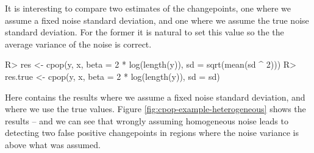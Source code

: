 \documentclass[article]{jss}
\begin{document}
It is interesting to compare two estimates of the changepoints, one where we assume a fixed noise standard deviation, and one where we assume the true noise standard deviation. For the former it is natural to set this value so the the average variance of the noise is correct. 
\begin{CodeChunk}
\begin{CodeInput}
R> res <- cpop(y, x, beta = 2 * log(length(y)), sd = sqrt(mean(sd ^ 2)))
R> res.true <- cpop(y, x, beta = 2 * log(length(y)), sd = sd)
\end{CodeInput}
\end{CodeChunk}
Here  contains the results where we assume a fixed noise standard deviation, and  where we use the true values. Figure \ref{fig:cpop-example-heterogeneous} shows the results -- and we can see that wrongly assuming homogeneous noise leads to detecting two false positive changepoints in regions where the noise variance is above what was assumed. 

\end{document}
